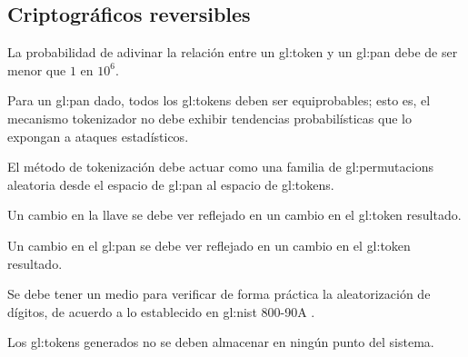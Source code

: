 %
%

\subsection{Criptográficos reversibles}

{
  La probabilidad de adivinar la relación entre un \gls{gl:token} y un
  \gls{gl:pan} debe de ser menor que $ 1 $ en $ 10^6 $.
}

{
  Para un \gls{gl:pan} dado, todos los \glspl{gl:token} deben ser
  equiprobables; esto es, el mecanismo tokenizador no debe exhibir
  tendencias probabilísticas que lo expongan a ataques estadísticos.
}

{
  El método de tokenización debe actuar como una familia de
  \glspl{gl:permutacion} aleatoria desde el espacio de \gls{gl:pan} al
  espacio de \glspl{gl:token}.
}

{
  Un cambio en la llave se debe ver reflejado en un cambio en el
  \gls{gl:token} resultado.
}

{
  Un cambio en el \gls{gl:pan} se debe ver reflejado en un cambio en el
  \gls{gl:token} resultado.
}

{
  Se debe tener un medio para verificar de forma práctica la aleatorización
  de dígitos, de acuerdo a lo establecido en \gls{gl:nist} 800-90A
  \cite{nist_aleatorios}.
}

{
  Los \glspl{gl:token} generados no se deben almacenar en ningún punto del
  sistema.
}


